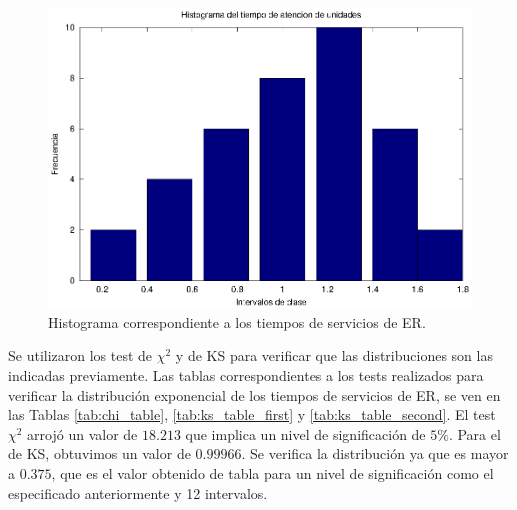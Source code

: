 \documentclass[a4paper,10pt]{article}
\begin{document}
\begin{figure}[ht]
\begin{center}
\includegraphics[width=12cm]{../src/parteA/hist_servicios.eps}
\caption{\label{fig:hist_servicios} Histograma correspondiente a los tiempos de servicios de ER.}
\end{center}
\end{figure}

Se utilizaron los test de  $\chi^2$ y de KS para verificar que las distribuciones son las indicadas previamente. Las tablas correspondientes a los tests realizados para verificar la distribución exponencial de los tiempos de servicios de ER, se ven en las Tablas \ref{tab:chi_table}, \ref{tab:ks_table_first} y \ref{tab:ks_table_second}. El test $\chi^2$ arrojó un valor de $18.213$ que implica un nivel de significación de $5\%$. Para el de KS, obtuvimos un valor de $0.99966$. Se verifica la distribución ya que es mayor a $0.375$, que es el valor obtenido de tabla para un nivel de significación como el especificado anteriormente y 12 intervalos.
\end{document}
